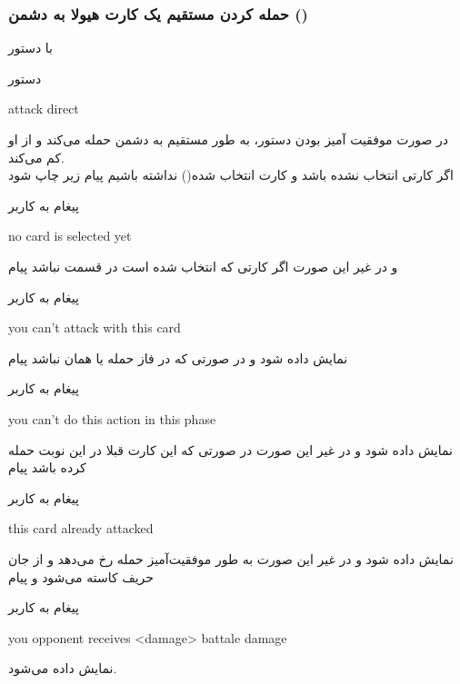 \documentclass[]{article}
\begin{document}
\subsubsection*{{\titr حمله کردن مستقیم یک کارت هیولا به دشمن ()}}
با دستور
\begin{mybox}[colback=yellow]{دستور}
	\begin{latin}	
		attack direct
	\end{latin}
\end{mybox}
    در صورت موفقیت آمیز بودن دستور، به طور مستقیم به دشمن حمله می‌کند و از 
     او کم می‌کند.
\\
اگر کارتی انتخاب نشده باشد و کارت انتخاب شده() نداشته باشیم 
پیام زیر چاپ شود
\begin{mybox}[colback=yellow]{پیغام به کاربر}
	\begin{latin}	
		no card is selected yet
	\end{latin}
\end{mybox}
و در غیر این صورت اگر کارتی که انتخاب شده است در قسمت 
نباشد پیام
\begin{mybox}[colback=yellow]{پیغام به کاربر}
	\begin{latin}	
		you can’t attack with this card
	\end{latin}
\end{mybox}
نمایش داده شود و در صورتی که در فاز حمله یا همان  نباشد 
پیام
\begin{mybox}[colback=yellow]{پیغام به کاربر}
	\begin{latin}	
		you can’t do this action in this phase
	\end{latin}
\end{mybox}
نمایش داده شود و در غیر این صورت در صورتی که این کارت قبلا در این نوبت حمله 
کرده باشد پیام
\begin{mybox}[colback=yellow]{پیغام به کاربر}
	\begin{latin}	
		this card already attacked	
	\end{latin}
\end{mybox}
نمایش داده شود و در غیر این صورت به طور موفقیت‌آمیز حمله رخ می‌دهد و از جان 
حریف کاسته می‌شود و پیام
\begin{mybox}[colback=yellow]{پیغام به کاربر}
	\begin{latin}	
		you opponent receives <damage> battale damage	
	\end{latin}
\end{mybox}
نمایش داده می‌شود.
\end{document}
